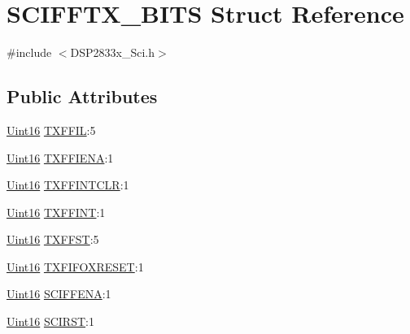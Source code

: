 \hypertarget{struct_s_c_i_f_f_t_x___b_i_t_s}{}\section{S\+C\+I\+F\+F\+T\+X\+\_\+\+B\+I\+T\+S Struct Reference}
\label{struct_s_c_i_f_f_t_x___b_i_t_s}


{\ttfamily \#include $<$D\+S\+P2833x\+\_\+\+Sci.\+h$>$}

\subsection*{Public Attributes}
\begin{DoxyCompactItemize}
\item 
\hyperlink{_d_s_p2833x___device_8h_a59a9f6be4562c327cbfb4f7e8e18f08b}{Uint16} \hyperlink{struct_s_c_i_f_f_t_x___b_i_t_s_a55f8a91cab6f1afd110415beb355d4ab}{T\+X\+F\+F\+I\+L}\+:5
\item 
\hyperlink{_d_s_p2833x___device_8h_a59a9f6be4562c327cbfb4f7e8e18f08b}{Uint16} \hyperlink{struct_s_c_i_f_f_t_x___b_i_t_s_a75d59a05ddc31554684e69ffd7bb1a8a}{T\+X\+F\+F\+I\+E\+N\+A}\+:1
\item 
\hyperlink{_d_s_p2833x___device_8h_a59a9f6be4562c327cbfb4f7e8e18f08b}{Uint16} \hyperlink{struct_s_c_i_f_f_t_x___b_i_t_s_af2466704b9d20ca19c3c53c8999380fc}{T\+X\+F\+F\+I\+N\+T\+C\+L\+R}\+:1
\item 
\hyperlink{_d_s_p2833x___device_8h_a59a9f6be4562c327cbfb4f7e8e18f08b}{Uint16} \hyperlink{struct_s_c_i_f_f_t_x___b_i_t_s_a3c595743b8d4c7227f780ea61780f75f}{T\+X\+F\+F\+I\+N\+T}\+:1
\item 
\hyperlink{_d_s_p2833x___device_8h_a59a9f6be4562c327cbfb4f7e8e18f08b}{Uint16} \hyperlink{struct_s_c_i_f_f_t_x___b_i_t_s_a87de1dbdea0ea037e52471bc82537a4d}{T\+X\+F\+F\+S\+T}\+:5
\item 
\hyperlink{_d_s_p2833x___device_8h_a59a9f6be4562c327cbfb4f7e8e18f08b}{Uint16} \hyperlink{struct_s_c_i_f_f_t_x___b_i_t_s_af03d54ce2400814bd1d9916f44ad9e6c}{T\+X\+F\+I\+F\+O\+X\+R\+E\+S\+E\+T}\+:1
\item 
\hyperlink{_d_s_p2833x___device_8h_a59a9f6be4562c327cbfb4f7e8e18f08b}{Uint16} \hyperlink{struct_s_c_i_f_f_t_x___b_i_t_s_aa222d51751c0ca83a39fd75de09f45b5}{S\+C\+I\+F\+F\+E\+N\+A}\+:1
\item 
\hyperlink{_d_s_p2833x___device_8h_a59a9f6be4562c327cbfb4f7e8e18f08b}{Uint16} \hyperlink{struct_s_c_i_f_f_t_x___b_i_t_s_a92ed676cd52a93dee1baeca8d12a7282}{S\+C\+I\+R\+S\+T}\+:1
\end{DoxyCompactItemize}



